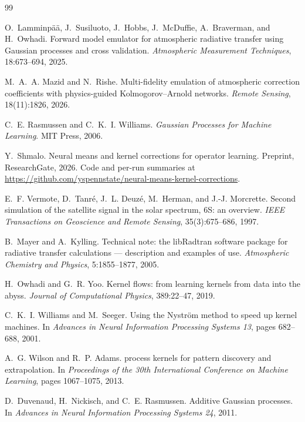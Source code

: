 \begin{thebibliography}{99}

O.~Lamminp\"a\"a, J.~Susiluoto, J.~Hobbs, J.~McDuffie, A.~Braverman, and H.~Owhadi.
\newblock Forward model emulator for atmospheric radiative transfer using Gaussian processes and
cross validation.
\newblock \emph{Atmospheric Measurement Techniques}, 18:673--694, 2025.

M.~A.~A. Mazid and N.~Rishe.
\newblock Multi-fidelity emulation of atmospheric correction coefficients with physics-guided
Kolmogorov--Arnold networks.
\newblock \emph{Remote Sensing}, 18(11):1826, 2026.

C.~E. Rasmussen and C.~K.~I. Williams.
\newblock \emph{Gaussian Processes for Machine Learning}.
\newblock MIT Press, 2006.

Y.~Shmalo.
\newblock Neural means and kernel corrections for operator learning.
\newblock Preprint, ResearchGate, 2026. Code and per-run summaries at
\url{https://github.com/yspennstate/neural-means-kernel-corrections}.

E.~F. Vermote, D.~Tanr\'e, J.~L. Deuz\'e, M.~Herman, and J.-J. Morcrette.
\newblock Second simulation of the satellite signal in the solar spectrum, 6S: an overview.
\newblock \emph{IEEE Transactions on Geoscience and Remote Sensing}, 35(3):675--686, 1997.

B.~Mayer and A.~Kylling.
\newblock Technical note: the {libRadtran} software package for radiative transfer
calculations --- description and examples of use.
\newblock \emph{Atmospheric Chemistry and Physics}, 5:1855--1877, 2005.

H.~Owhadi and G.~R. Yoo.
\newblock Kernel flows: from learning kernels from data into the abyss.
\newblock \emph{Journal of Computational Physics}, 389:22--47, 2019.

C.~K.~I. Williams and M.~Seeger.
\newblock Using the {Nystr\"om} method to speed up kernel machines.
\newblock In \emph{Advances in Neural Information Processing Systems 13}, pages 682--688, 2001.

A.~G. Wilson and R.~P. Adams.
 process kernels for pattern discovery and extrapolation.
\newblock In \emph{Proceedings of the 30th International Conference on Machine Learning},
pages 1067--1075, 2013.

D.~Duvenaud, H.~Nickisch, and C.~E. Rasmussen.
\newblock Additive {Gaussian} processes.
\newblock In \emph{Advances in Neural Information Processing Systems 24}, 2011.


\end{thebibliography}
